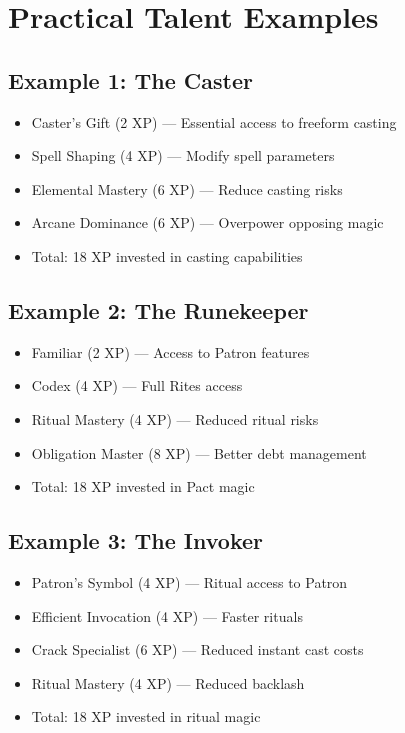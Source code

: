 \documentclass[11pt,twoside,openany]{book}
\begin{document}
\section*{Practical Talent Examples} 

\subsection*{Example 1: The Caster}

\begin{itemize}
\item Caster's Gift (2 XP) — Essential access to freeform casting
\item Spell Shaping (4 XP) — Modify spell parameters
\item Elemental Mastery (6 XP) — Reduce casting risks
\item Arcane Dominance (6 XP) — Overpower opposing magic
\item Total: 18 XP invested in casting capabilities
\end{itemize}

\subsection*{Example 2: The Runekeeper}

\begin{itemize}
\item Familiar (2 XP) — Access to Patron features
\item Codex (4 XP) — Full Rites access
\item Ritual Mastery (4 XP) — Reduced ritual risks
\item Obligation Master (8 XP) — Better debt management
\item Total: 18 XP invested in Pact magic
\end{itemize}

\subsection*{Example 3: The Invoker}

\begin{itemize}
\item Patron's Symbol (4 XP) — Ritual access to Patron
\item Efficient Invocation (4 XP) — Faster rituals
\item Crack Specialist (6 XP) — Reduced instant cast costs
\item Ritual Mastery (4 XP) — Reduced backlash
\item Total: 18 XP invested in ritual magic
\end{itemize}
\end{document}
